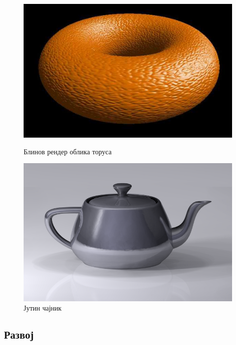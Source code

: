 \documentclass[12pt]{article}
\begin{document}
	\begin{figure}[H]
		\begin{minipage}{0.4\linewidth}
		\centering
		\includegraphics[max width=\linewidth]{slike/prviRenderiBlin.jpg}
		\caption{Блинов рендер облика торуса}
		\label{fig:blin}
		\end{minipage}\hfill
		\begin{minipage}{0.4\linewidth}
		\centering
		\includegraphics[max width=\linewidth]{slike/jutinCajnik.png}
		\caption{Јутин чајник}
		\label{fig:jutincajnik}
		\end{minipage}
	\end{figure}
	


	\subsection{Развој}
\end{document}
